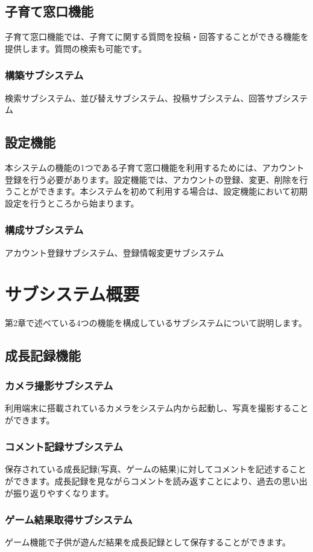 \documentclass[a4j]{jarticle}
\begin{document}
\subsection{子育て窓口機能}
子育て窓口機能では、子育てに関する質問を投稿・回答することができる機能を提供します。質問の検索も可能です。
\subsubsection*{構築サブシステム}
\noindent 検索サブシステム、並び替えサブシステム、投稿サブシステム、回答サブシステム

\subsection{設定機能}
本システムの機能の1つである子育て窓口機能を利用するためには、アカウント登録を行う必要があります。設定機能では、アカウントの登録、変更、削除を行うことができます。本システムを初めて利用する場合は、設定機能において初期設定を行うところから始まります。
\subsubsection*{構成サブシステム}
\noindent アカウント登録サブシステム、登録情報変更サブシステム



\newpage
\section{サブシステム概要}
第2章で述べている4つの機能を構成しているサブシステムについて説明します。

\subsection{成長記録機能}
\subsubsection*{カメラ撮影サブシステム}
利用端末に搭載されているカメラをシステム内から起動し、写真を撮影することができます。
\subsubsection*{コメント記録サブシステム}
保存されている成長記録(写真、ゲームの結果)に対してコメントを記述することができます。成長記録を見ながらコメントを読み返すことにより、過去の思い出が振り返りやすくなります。
\subsubsection*{ゲーム結果取得サブシステム}
ゲーム機能で子供が遊んだ結果を成長記録として保存することができます。
\end{document}
